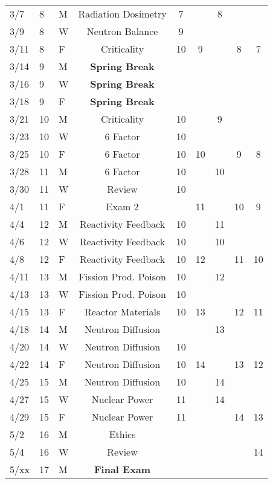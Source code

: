 \documentclass[11pt, a4paper]{article}
\begin{document}
\begin{table}[h]
\begin{center}
\begin{tabular}{lllcccccc}
3/7 & 8 & M & Radiation Dosimetry     & 7 &  & 8 &  &  \\
3/9 & 8 & W & Neutron Balance         & 9 &   &  &  &  \\
3/11 & 8 & F & Criticality        & 10 & 9 &  & 8 & 7 \\
3/14 & 9 & M & \textbf{Spring Break}&  &  &  &  &  \\
3/16 & 9 & W & \textbf{Spring Break}&  &  &  &  &  \\
3/18 & 9 & F & \textbf{Spring Break}&  &  &  &  &  \\
3/21 & 10 & M & Criticality          & 10 &  & 9 &  &  \\
3/23 & 10 & W & 6 Factor          & 10 &  &  &  &  \\
3/25 & 10 & F & 6 Factor          & 10 & 10 &  & 9 & 8 \\
3/28 & 11 & M & 6 Factor            & 10 &  & 10 &  &  \\
3/30 & 11 & W & Review            & 10 &  &  &  & \\
4/1 & 11 & F & Exam 2  &  &  11 &  & 10 & 9 \\
4/4 & 12 & M & Reactivity Feedback &  10  &   & 11 &  &  \\
4/6 & 12 & W & Reactivity Feedback & 10  &  & 10 &  &  \\
4/8 & 12 & F & Reactivity Feedback & 10 & 12 &  & 11 & 10 \\
4/11 & 13 & M & Fission Prod. Poison & 10 &  & 12 & &  \\
4/13 & 13 & W & Fission Prod. Poison & 10 &  &  &  &  \\
4/15 & 13 & F & Reactor Materials    & 10 & 13 &  & 12 & 11 \\
4/18 & 14 & M & Neutron Diffusion    &  &  & 13  &  &  \\
4/20 & 14 & W & Neutron Diffusion    & 10 & &  &  & \\
4/22 & 14 & F & Neutron Diffusion    & 10 & 14 &  & 13 & 12 \\
4/25 & 15 & M & Neutron Diffusion    & 10  &  & 14 & &  \\
4/27 & 15 & W & Nuclear Power        & 11 &  & 14 &  &  \\
4/29 & 15 & F & Nuclear Power        & 11 &  &  & 14 & 13 \\
5/2 & 16 & M & Ethics                &  &  & &  &      \\
5/4 & 16 & W &  Review               &  &  &  &  &  14 \\
5/xx & 17 & M & \textbf{Final Exam}  &  &  &  &  &     \\
\end{tabular}
\end{center}
\end{table}
\FloatBarrier



\end{document}
